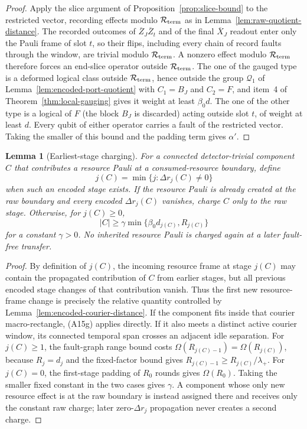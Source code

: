 \documentclass[aps,prx,reprint,superscriptaddress,nofootinbib,floatfix,longbibliography]{revtex4-2}
\newtheorem{lemma}[theorem]{Lemma}
\theoremstyle{definition}
\begin{document}
\begin{proof}
Apply the slice argument of Proposition~\ref{prop:slice-bound} to the
restricted vector, recording effects modulo $\mathcal R_{\rm term}$ as in
Lemma~\ref{lem:raw-quotient-distance}.  The recorded outcomes of
$\overline Z_J\overline Z_t$ and of the final $\overline X_J$ readout enter
only the Pauli frame of slot $t$, so their flips, including every chain of
record faults through the window, are trivial modulo $\mathcal R_{\rm term}$.
A nonzero effect modulo $\mathcal R_{\rm term}$ therefore forces an end-slice
operator outside $\mathcal R_{\rm term}$.  The one of the gauged type is a
deformed logical class outside $\mathcal R_{\rm term}$, hence outside the
group $\mathcal Q_1$ of Lemma~\ref{lem:encoded-port-quotient} with $C_1=B_J$
and $C_2=F$, and item~4 of Theorem~\ref{thm:local-gauging} gives it weight at
least $\beta_0d$.  The one of the other type is a logical of $F$ (the block
$B_J$ is discarded) acting outside slot $t$, of weight at least $d$.  Every
qubit of either operator carries a fault of the restricted vector.  Taking
the smaller of this bound and the padding term gives $\alpha'$.
\end{proof}

\begin{lemma}[Earliest-stage charging]\label{lem:earliest-stage-charging}
For a connected detector-trivial component $C$ that contributes a resource
Pauli at a consumed-resource boundary, define
\begin{equation*}
 j(C)=\min\{j:\Delta r_j(C)\neq0\}
\end{equation*}
when such an encoded stage exists.  If the resource Pauli is already created
at the raw boundary and every encoded $\Delta r_j(C)$ vanishes, charge $C$ only
to the raw stage.  Otherwise, for $j(C)\geq0$,
\begin{equation}
 |C|\geq\gamma\min\{\beta_0d_{j(C)},R_{j(C)}\}                    \tag{A15h}
\end{equation}
for a constant $\gamma>0$.  No inherited resource Pauli is charged again at a
later fault-free transfer.
\end{lemma}
\begin{proof}
By definition of $j(C)$, the incoming resource frame at stage $j(C)$ may
contain the propagated contribution of $C$ from earlier stages, but all
previous encoded stage changes of that contribution vanish.  Thus the first
new resource-frame change is precisely the relative quantity controlled by
Lemma~\ref{lem:encoded-courier-distance}.  If the component fits inside that courier
macro-rectangle, (A15g) applies directly.  If it also meets a distinct active
courier window, its connected temporal span crosses an adjacent idle
separation.  For $j(C)\geq1$, the fault-graph range bound costs
$\Omega(R_{j(C)-1})=\Omega(R_{j(C)})$, because $R_j=d_j$ and the
fixed-factor bound gives $R_{j(C)-1}\ge R_{j(C)}/\lambda_+$.  For $j(C)=0$,
the first-stage padding of $R_0$ rounds gives $\Omega(R_0)$.  Taking the
smaller fixed constant in the two cases gives $\gamma$.  A component whose only new resource effect is
at the raw boundary is instead assigned there and receives only the constant
raw charge; later zero-$\Delta r_j$ propagation never creates a second charge.
\end{proof}
\end{document}
